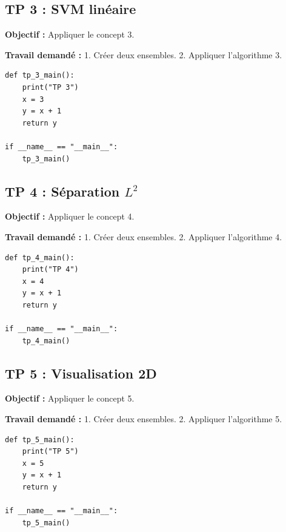 \documentclass[11pt,a4paper]{article}
\begin{document}
\subsection*{TP 3 : SVM linéaire}

\textbf{Objectif :}
Appliquer le concept 3.

\textbf{Travail demandé :}
1. Créer deux ensembles.
2. Appliquer l'algorithme 3.

\begin{lstlisting}
def tp_3_main():
    print("TP 3")
    x = 3
    y = x + 1
    return y

if __name__ == "__main__":
    tp_3_main()
\end{lstlisting}


\subsection*{TP 4 : Séparation $L^2$}

\textbf{Objectif :}
Appliquer le concept 4.

\textbf{Travail demandé :}
1. Créer deux ensembles.
2. Appliquer l'algorithme 4.

\begin{lstlisting}
def tp_4_main():
    print("TP 4")
    x = 4
    y = x + 1
    return y

if __name__ == "__main__":
    tp_4_main()
\end{lstlisting}


\subsection*{TP 5 : Visualisation 2D}

\textbf{Objectif :}
Appliquer le concept 5.

\textbf{Travail demandé :}
1. Créer deux ensembles.
2. Appliquer l'algorithme 5.

\begin{lstlisting}
def tp_5_main():
    print("TP 5")
    x = 5
    y = x + 1
    return y

if __name__ == "__main__":
    tp_5_main()
\end{lstlisting}
\end{document}
